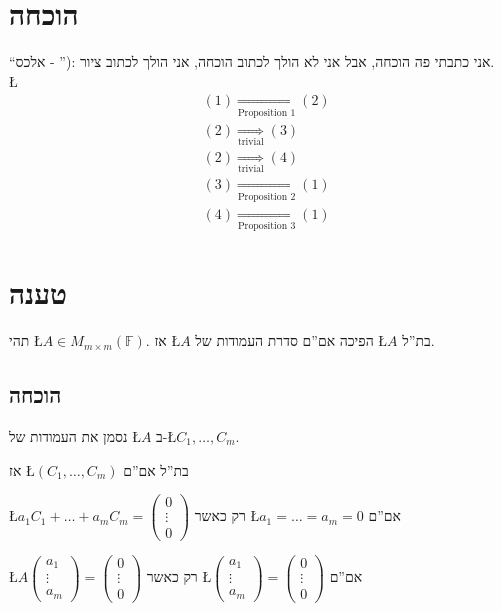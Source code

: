 \documentclass[english,hebrew]{article}
\begin{document}
\section{הוכחה}

\textquotedblleft אני כתבתי פה הוכחה, אבל אני לא הולך לכתוב הוכחה,
אני הולך לכתוב ציור :(\textquotedblright{} - אלכס.\\
\L{%
\begin{align*}
 & (1)\underset{\text{Proposition 1}}{\Rightarrow}(2)\\
 & (2)\underset{\text{trivial}}{\Rightarrow}(3)\\
 & (2)\underset{\text{trivial}}{\Rightarrow}(4)\\
 & (3)\underset{\text{Proposition 2}}{\Rightarrow}(1)\\
 & (4)\underset{\text{Proposition 3}}{\Rightarrow}(1)
\end{align*}
}%

\section{טענה}

תהי \L{$A\in M_{m\times m}(\mathbb{F})$}. אז \L{$A$} הפיכה אם\textquotedblright ם
סדרת העמודות של \L{$A$} בת\textquotedblright ל. 

\subsection{הוכחה}

נסמן את העמודות של \L{$A$} ב-\L{$C_{1},\dots,C_{m}$}.

אז \L{$(C_{1},\dots,C_{m})$} בת\textquotedblright ל אם\textquotedblright ם

\L{$a_{1}C_{1}+\dots+a_{m}C_{m}=\begin{pmatrix}0\\
\vdots\\
0
\end{pmatrix}$} רק כאשר \L{$a_{1}=\dots=a_{m}=0$} אם\textquotedblright ם

\L{$A\begin{pmatrix}a_{1}\\
\vdots\\
a_{m}
\end{pmatrix}=\begin{pmatrix}0\\
\vdots\\
0
\end{pmatrix}$} רק כאשר \L{$\begin{pmatrix}a_{1}\\
\vdots\\
a_{m}
\end{pmatrix}=\begin{pmatrix}0\\
\vdots\\
0
\end{pmatrix}$} אם\textquotedblright ם
\end{document}
